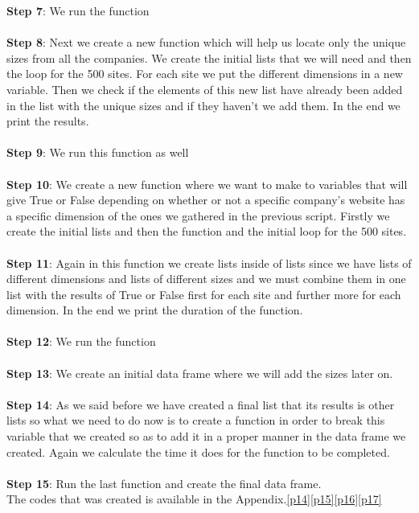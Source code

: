\documentclass{article}
\begin{document}
\textbf{Step 7}: We run the function\\\\
\textbf{Step 8}: Next we create a new function which will help us locate only the unique sizes from all the companies. We create the initial lists that we will need and then the loop for the 500 sites. For each site we put the different dimensions in a new variable. Then we check if the elements of this new list have already been added in the list with the unique sizes and if they haven't we add them. In the end we print the results.\\\\
\textbf{Step 9}: We run this function as well\\\\
\textbf{Step 10}: We create a new function where we want to make to variables that will give True or False depending on whether or not a specific company's website has a specific dimension of the ones we gathered in the previous script. Firstly we create the initial lists and then the function and the initial loop for the 500 sites.\\\\
\textbf{Step 11}: Again in this function we create lists inside of lists since we have lists of different dimensions and lists of different sizes and we must combine them in one list with the results of True or False first for each site and further more for each dimension. In the end we print the duration of the function.\\\\
\textbf{Step 12}: We run the function\\\\
\textbf{Step 13}: We create an initial data frame where we will add the sizes later on.\\\\
\textbf{Step 14}: As we said before we have created a final list that its results is other lists so what we need to do now is to create a function in order to break this variable that we created so as to add it in a proper manner in the data frame we created. Again we calculate the time it does for the function to be completed.\\\\
\textbf{Step 15}: Run the last function and create the final data frame.\\
The codes that was created is available in the Appendix.\ref{p14}\ref{p15}\ref{p16}\ref{p17}                 
\end{document}
